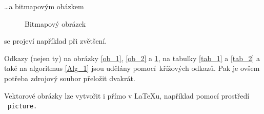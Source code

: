 \documentclass[11pt,a4paper]{article}
\begin{document}
\vspace{0.25cm}

\hspace{-0.5cm} \dots a bitmapovým obázkem

\begin{figure}[h]
  \centering
  \caption{Bitmapový obrázek}
  \label{ob_3}
\end{figure}
\hspace{-0.5cm}se projeví například při zvětšení.

Odkazy (nejen ty) na obrázky \ref{ob_1}, \ref{ob_2} a \ref{ob_3}, na tabulky \ref{tab_1} a \ref{tab_2} a také na algoritmus \ref{Alg_1} jsou udělány pomocí~křížových odkazů. Pak je ovšem potřeba zdrojový soubor přeložit dvakrát.

Vektorové obrázky lze vytvořit i přímo v \LaTeX u, například pomocí prostředí \ \texttt{picture.}

\pagebreak
\end{document}
